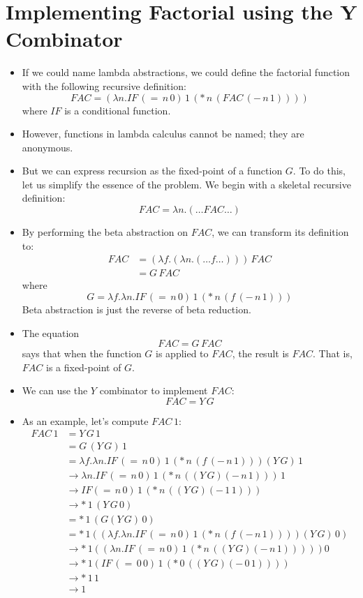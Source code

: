 \documentclass[]{article}
\begin{document}
\section{Implementing Factorial using the Y Combinator}
\begin{itemize}
\item If we could name lambda abstractions, we could define the factorial function with the following recursive definition:
\[ FAC = (\lambda n.IF\,(=\,n\,0)\,1\,(*\,n\,(FAC\,(-\,n\,1)))) \]
where $IF$ is a conditional function.
\item However, functions in lambda calculus cannot be named; they are anonymous.
\item But we can express recursion as the fixed-point of a function $G$. To do this, let us simplify the essence of the problem. We begin with a skeletal recursive definition:
\[ FAC = \lambda n.(\ldots FAC \ldots) \]
\item By performing the beta abstraction on $FAC$, we can transform its definition to:
\begin{align*}
FAC &= (\lambda f.(\lambda n.(\ldots f \ldots)))\, FAC \\
    &= G\,FAC
\end{align*}
where
\[ G = \lambda f.\lambda n.IF\,(=\,n\,0)\,1\,(*\,n\,(f\,(-\,n\,1))) \]
Beta abstraction is just the reverse of beta reduction.
\item The equation
\[ FAC = G\,FAC \]
says that when the function $G$ is applied to $FAC$, the result is $FAC$. That is, $FAC$ is a fixed-point of $G$.
\item We can use the $Y$ combinator to implement $FAC:$
\[ FAC = Y\,G \]
\item As an example, let's compute $FAC\,1$:
\begin{align*}
FAC\,1 &= Y\,G\,1      \\
&= G\,(Y\,G)\,1 \\
&= \lambda f.\lambda n.IF\,(=\,n\,0)\,1\,(*\,n\,(f\,(-\,n\,1)))(Y\,G)\,1 \\
&\rightarrow \lambda n.IF\,(=\,n\,0)\,1\,(*\,n\,((Y\,G)(-\,n\,1)))\,1    \\
&\rightarrow IF (=\,n\,0)\,1\,(*\,n\,((Y\,G)(-\,1\,1))) \\
&\rightarrow *\,1\,(Y\,G\,0) \\
&= *\,1\,(G(Y\,G)\,0) \\
&= *\,1((\lambda f.\lambda n.IF\,(=\,n\,0)\,1\,(*\,n\,(f\,(-\,n\,1))))(Y\,G)\,0)\\
&\rightarrow *\,1((\lambda n.IF\,(=\,n\,0)\,1\,(*\,n\,((Y\,G)(-\,n\,1)))))0 \\
&\rightarrow *\,1(IF\,(=\,0\,0)\,1\,(*\,0\,((Y\,G)(-\,0\,1)))) \\
&\rightarrow *\,1\,1 \\
&\rightarrow 1     
\end{align*}
\end{itemize}
\end{document}
